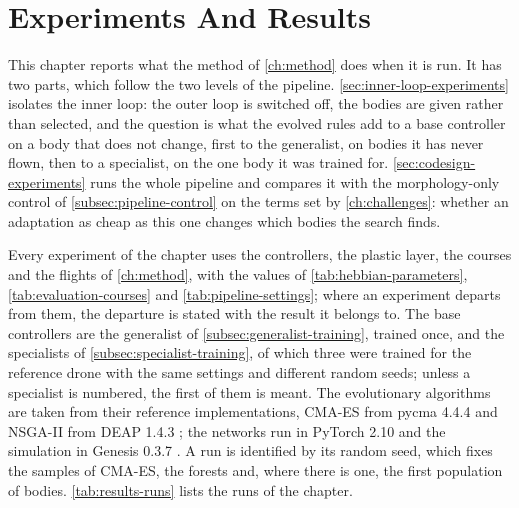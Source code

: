 \chapter{Experiments And Results}
\label{ch:results}

This chapter reports what the method of \autoref{ch:method} does when it is run. It has two parts, which follow the two levels of the pipeline. \autoref{sec:inner-loop-experiments} isolates the inner loop: the outer loop is switched off, the bodies are given rather than selected, and the question is what the evolved rules add to a base controller on a body that does not change, first to the generalist, on bodies it has never flown, then to a specialist, on the one body it was trained for. \autoref{sec:codesign-experiments} runs the whole pipeline and compares it with the morphology-only control of \autoref{subsec:pipeline-control} on the terms set by \autoref{ch:challenges}: whether an adaptation as cheap as this one changes which bodies the search finds.

Every experiment of the chapter uses the controllers, the plastic layer, the courses and the flights of \autoref{ch:method}, with the values of \autoref{tab:hebbian-parameters}, \autoref{tab:evaluation-courses} and \autoref{tab:pipeline-settings}; where an experiment departs from them, the departure is stated with the result it belongs to. The base controllers are the generalist of \autoref{subsec:generalist-training}, trained once, and the specialists of \autoref{subsec:specialist-training}, of which three were trained for the reference drone with the same settings and different random seeds; unless a specialist is numbered, the first of them is meant. The evolutionary algorithms are taken from their reference implementations, CMA-ES from pycma 4.4.4 \cite{hansen2019pycma} and NSGA-II from DEAP 1.4.3 \cite{fortin2012deap}; the networks run in PyTorch 2.10 \cite{paszke2019pytorch} and the simulation in Genesis 0.3.7 \cite{genesis2024}. A run is identified by its random seed, which fixes the samples of CMA-ES, the forests and, where there is one, the first population of bodies. \autoref{tab:results-runs} lists the runs of the chapter.

